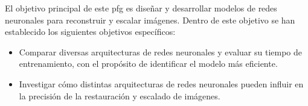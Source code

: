 \quad El objetivo principal de este \gls{pfg} es diseñar y desarrollar modelos de redes neuronales para reconstruir y escalar imágenes. Dentro de este objetivo se han establecido los siguientes objetivos específicos:

\begin{itemize}
	\item Comparar diversas arquitecturas de redes neuronales y evaluar su tiempo de entrenamiento, con el propósito de identificar el modelo más eficiente.
	\item Investigar cómo distintas arquitecturas de redes neuronales pueden influir en la precisión de la restauración y escalado de imágenes.

\end{itemize}




